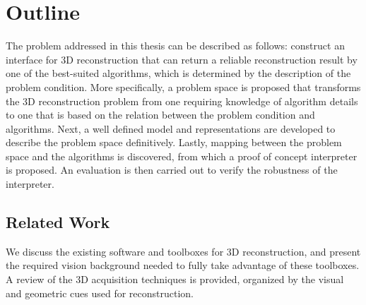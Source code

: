 



\section{Outline}
The problem addressed in this thesis can be described as follows: construct an interface for 3D reconstruction that can return a reliable reconstruction result by one of the best-suited algorithms, which is determined by the description of the problem condition. More specifically, a problem space is proposed that transforms the 3D reconstruction problem from one requiring knowledge of algorithm details to one that is based on the relation between the problem condition and algorithms. Next, a well defined model and representations are developed to describe the problem space definitively. Lastly, mapping between the problem space and the algorithms is discovered, from which a proof of concept interpreter is proposed. An evaluation is then carried out to verify the robustness of the interpreter.

\subsection{Related Work}
We discuss the existing software and toolboxes for 3D reconstruction, and present the required vision background needed to fully take advantage of these toolboxes. A review of the 3D acquisition techniques is provided, organized by the visual and geometric cues used for reconstruction.

